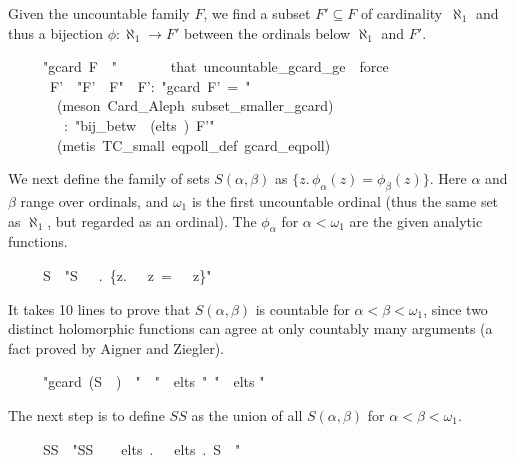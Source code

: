 \documentclass[runningheads]{llncs}
\begin{document}
\noindent
Given the uncountable family $F$, we find a subset $F'\subseteq F$ of cardinality~$\aleph_1$  and thus a bijection $\phi:\aleph_1\to F'$  between the ordinals below $\aleph_1$ and $F'$.
\begin{isabelle}
\ \ \ \ \ "gcard\ F\ \isasymge \ "\isanewline
\ \ \ \ \ \ \ that\ uncountable\_gcard\_ge\ \ force\ \isanewline
\ \ \ \ \ \ F'\ \ "F'\ \isasymsubseteq \ F"\ \ F':\ "gcard\ F'\ =\ "\isanewline
\ \ \ \ \ \ \ (meson\ Card\_Aleph\ subset\_smaller\_gcard)\isanewline
\ \ \ \ \ \ \isasymphi \ \ \isasymphi :\ "bij\_betw\ \isasymphi \ (elts\ )\ F'"\isanewline
\ \ \ \ \ \ \ (metis\ TC\_small\ eqpoll\_def\ gcard\_eqpoll)
\end{isabelle}

\noindent
We next define the family of sets $S(\alpha,\beta)$ as  $\{z.\, \phi_\alpha (z) = \phi_\beta (z)\}$.
Here $\alpha$ and $\beta$ range over ordinals, and $\omega_1$ is the first uncountable ordinal (thus the same set as $\aleph_1$, but regarded as an ordinal).
The $\phi_\alpha$ for $\alpha<\omega_1$ are the given analytic functions.
\begin{isabelle}
\ \ \ \ \ S\ \ "S\ \isasymequiv \ \isasymlambda \isasymalpha \ \isasymbeta .\ \{z.\ \isasymphi \ \isasymalpha \ z\ =\ \isasymphi \ \isasymbeta \ z\}"
\end{isabelle}

It takes 10 lines to prove that $S(\alpha,\beta)$ is countable for $\alpha<\beta<\omega_1$,
since two distinct holomorphic functions can agree at only countably many arguments (a fact proved by Aigner and Ziegler).
\begin{isabelle}
\ \ \ \ \ "gcard\ (S\ \isasymalpha \ \isasymbeta )\ \isasymle \ "\ \ "\isasymalpha\ \isasymin\ elts\ \isasymbeta "\ "\isasymbeta\ \isasymin\ elts "\ \ \isasymalpha \ \isasymbeta
\end{isabelle}

The next step is to define $SS$ as the union of all $S(\alpha,\beta)$ for $\alpha<\beta<\omega_1$.
\begin{isabelle}
\ \ \ \ \ SS\ \ "SS\ \isasymequiv\ \isasymSqunion \isasymbeta \ \isasymin \ elts\ .\ \isasymSqunion \isasymalpha \ \isasymin \ elts\ \isasymbeta .\ S\ \isasymalpha \ \isasymbeta "
\end{isabelle}
\end{document}
